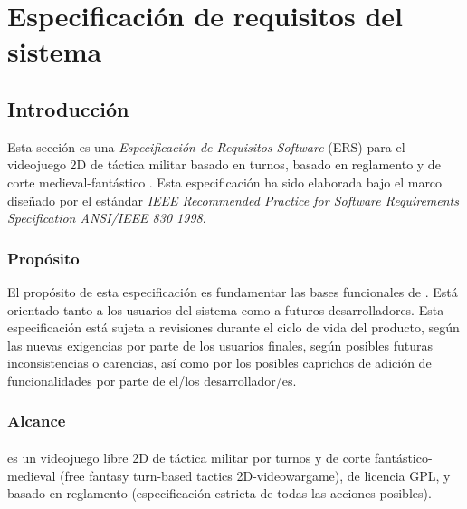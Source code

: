 %


\section{Especificación de requisitos del sistema}
\label{sec:ers}

\subsection{Introducción}

Esta sección es una \emph{Especificación de Requisitos Software} (ERS) para el videojuego 2D de táctica militar basado en turnos, basado en reglamento y de corte medieval-fantástico \gomf. Esta especificación ha sido elaborada bajo el marco diseñado por el estándar \emph{IEEE Recommended Practice for Software Requirements Specification ANSI/IEEE 830 1998}.

\subsubsection{Propósito}
\label{sec:proposito}
El propósito de esta especificación es fundamentar las bases funcionales de \gomf. Está orientado tanto a los usuarios del sistema como a futuros desarrolladores. Esta especificación está sujeta a revisiones durante el ciclo de vida del producto, según las nuevas exigencias por parte de los usuarios finales, según posibles futuras inconsistencias o carencias, así como por los posibles caprichos de adición de funcionalidades por parte de el/los desarrollador/es.

\subsubsection{Alcance}
\label{sec:proposito}

\paragraph{\gomf}
\gom es un videojuego libre 2D de táctica militar por turnos y de corte fantástico-medieval (free fantasy turn-based tactics 2D-videowargame), de licencia GPL, y basado en reglamento (especificación estricta de todas las acciones posibles).

